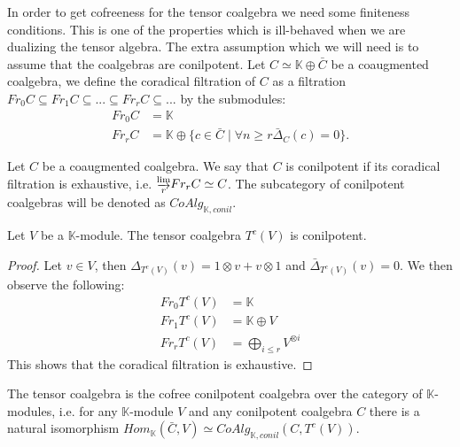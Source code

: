 \documentclass[../thesis.tex]{subfiles}
\begin{document}
            In order to get cofreeness for the tensor coalgebra we need some finiteness conditions. This is one of the properties which is ill-behaved when we are dualizing the tensor algebra. The extra assumption which we will need is to assume that the coalgebras are conilpotent. Let $C \simeq \mathbb{K} \oplus \bar{C}$ be a coaugmented coalgebra, we define the coradical filtration of $C$ as a filtration $Fr_0C \subseteq Fr_1C \subseteq ... \subseteq Fr_rC \subseteq ...$ by the submodules:
            \begin{align*}
                Fr_0C & = \mathbb{K} \\
                Fr_rC & = \mathbb{K} \oplus \{c\in\bar{C}\mid \forall n\geq r \bar{\Delta}_C(c) = 0\}.
            \end{align*}

            \begin{definition}
                Let $C$ be a coaugmented coalgebra. We say that $C$ is conilpotent if its coradical filtration is exhaustive, i.e. $\substack{\varinjlim \\ r}Fr_rC \simeq C$. The subcategory of conilpotent coalgebras will be denoted as $CoAlg_{\mathbb{K},conil}$.
            \end{definition}
            
            \begin{proposition}\label{prop: conilpotent-tensor}
                Let $V$ be a $\mathbb{K}$-module. The tensor coalgebra $T^c(V)$ is conilpotent.
            \end{proposition}

            \begin{proof}
                Let $v\in V$, then $\Delta_{T^c(V)}(v)=1\otimes v + v\otimes 1$ and $\bar{\Delta}_{T^c(V)}(v)=0$. We then observe the following:
                \begin{align*}
                    Fr_0T^c(V) & = \mathbb{K} \\
                    Fr_1T^c(V) & = \mathbb{K} \oplus V \\
                    Fr_rT^c(V) & = \bigoplus_{i\leq r} V^{\otimes i}
                \end{align*}
                This shows that the coradical filtration is exhaustive.
            \end{proof}

            \begin{proposition}\label{prop: cofree-tensor}
                The tensor coalgebra is the cofree conilpotent coalgebra over the category of $\mathbb{K}$-modules, i.e. for any $\mathbb{K}$-module $V$ and any conilpotent coalgebra $C$ there is a natural isomorphism $Hom_{\mathbb{K}}(\bar{C}, V)\simeq CoAlg_{\mathbb{K}, conil}(C, T^c(V))$.
            \end{proposition}
\end{document}
